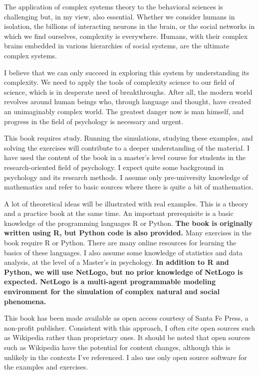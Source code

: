 \documentclass[
  a4paper,
  DIV=11,
  numbers=noendperiod,
  oneside]{scrreprt}
\begin{document}
The application of complex systems theory to the behavioral sciences is
challenging but, in my view, also essential. Whether we consider humans
in isolation, the billions of interacting neurons in the brain, or the
social networks in which we find ourselves, complexity is everywhere.
Humans, with their complex brains embedded in various hierarchies of
social systems, are the ultimate complex systems.

I believe that we can only succeed in exploring this system by
understanding its complexity. We need to apply the tools of complexity
science to our field of science, which is in desperate need of
breakthroughs. After all, the modern world revolves around human beings
who, through language and thought, have created an unimaginably complex
world. The greatest danger now is man himself, and progress in the field
of psychology is necessary and urgent.

This book requires study. Running the simulations, studying these
examples, and solving the exercises will contribute to a deeper
understanding of the material. I have used the content of the book in a
master's level course for students in the research-oriented field of
psychology. I expect quite some background in psychology and its
research methods. I assume only pre-university knowledge of mathematics
and refer to basic sources where there is quite a bit of mathematics.

A lot of theoretical ideas will be illustrated with real examples. This
is a theory and a practice book at the same time. An important
prerequisite is a basic knowledge of the programming languages R or
Python. \textbf{The book is originally written using R, but Python code
is also provided.} Many exercises in the book require R or Python. There
are many online resources for learning the basics of these languages. I
also assume some knowledge of statistics and data analysis, at the level
of a Master's in psychology. \textbf{In addition to R and Python, we
will use NetLogo, but no prior knowledge of NetLogo is expected. NetLogo
is a multi-agent programmable modeling environment for the simulation of
complex natural and social phenomena.}

This book has been made available as open access courtesy of Santa Fe
Press, a non-profit publisher. Consistent with this approach, I often
cite open sources such as Wikipedia rather than proprietary ones. It
should be noted that open sources such as Wikipedia have the potential
for content changes, although this is unlikely in the contexts I've
referenced. I also use only open source software for the examples and
exercises.
\end{document}
